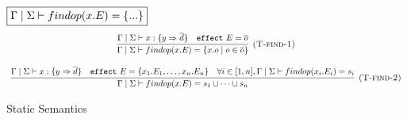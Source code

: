 \documentclass{article}
\newcommand{\keywadj}[1]{\mathtt{#1}}
\newcommand{\keyw}[1]{\keywadj{#1}~}
\begin{document}
\begin{figure}[H]
\noindent$\fbox{$\Gamma \mid \Sigma \vdash findop(x.E) = \{...\} $}$
\[
\begin{array}{c}
      \infer[\textsc{(T-find-1)}]
  {\Gamma \mid \Sigma \vdash findop(x.E) = \{x.o \mid o \in \overline{o}\} }
  {\Gamma \mid \Sigma \vdash x : \{y \Rightarrow \overline{d}\} & \keyw{effect} E = \overline{o}} \\[3ex]
        \infer[\textsc{(T-find-2)}]
  {\Gamma \mid \Sigma \vdash findop(x.E) = s_1 \cup \dots \cup s_n }
  {\Gamma \mid \Sigma \vdash x : \{y \Rightarrow \overline{d}\} & \keyw{effect} E = \{x_1.E_1, \dots, x_n.E_n\} & \forall i \in [1, n], \Gamma \mid \Sigma \vdash findop(x_i.E_i) = s_i} 
\end{array} 
\]

\caption{Static Semantics}
\label{wrap-static}
\end{figure}
\end{document}

